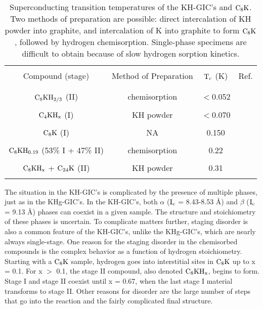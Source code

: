 \begin{table}
\begin{center}
\caption[Superconducting transition temperatures of the
KH-GIC's]{Superconducting transition temperatures of the KH-GIC's  and $\rm
C_8K$.  Two methods of preparation are possible: direct intercalation of KH
powder into graphite,\cite{enoki88a}  and intercalation of K  into graphite
to   form  $\rm C_8K$,  followed  by hydrogen  chemisorption.\cite{enoki85}
Single-phase specimens are difficult  to  obtain  because of  slow hydrogen
sorption kinetics.\cite{suzuki85b,enoki85}}
\vspace{0.5in}
\label{khtctable}
\begin{tabular}{|cccc|}
\hline
& & & \\
Compound (stage) & Method of Preparation & $\rm T_c$ (K) & Ref. \\
& & & \\
\hline
& & & \\
$\rm C_8KH_{2/3}$ (II)& chemisorption & $<$0.052 & \cite{sano80}\\
& & & \\
$\rm C_4KH_x$ (I)& KH powder & $<$0.070 & \cite{suzuki85b}\\
& & & \\
$\rm C_8K$ (I) & NA & 0.150 & \cite{koike80}\\
& & & \\
$\rm C_8KH_{0.19}$ (53\% I + 47\% II)& chemisorption& 0.22 & \cite{kaneiwa82}\\
& & & \\
$\rm C_8KH_x$ + $\rm C_{24}K$ (II)& KH powder & 0.31 & \cite{suzuki85b}\\
& & & \\
\hline
\end{tabular}
\end{center}
\end{table}

        The situation  in  the KH-GIC's is complicated  by the  presence of
multiple phases, just as in the KHg-GIC's.  In  the KH-GIC's, both $\alpha$
($\rm I_c$ = 8.43-8.53 \AA) and $\beta$ ($\rm I_c$ = 9.13  \AA)  phases can
coexist   in  a  given  sample.\cite{I217,suzuki85b}   The structure    and
stoichiometry of these phases is uncertain.\cite{miyajima88}  To complicate
matters further, staging disorder is also a common feature of the KH-GIC's,
unlike the KHg-GIC's, which are nearly always single-stage.  One reason for
the staging disorder in  the chemisorbed compounds  is the complex behavior
as  a  function of   hydrogen stoichiometry.   Starting  with  a $\rm C_8K$
sample, hydrogen goes into interstitial sites in $\rm C_8K$ up  to x = 0.1.
For x $>$ 0.1, the stage II compound, also denoted $\rm C_8KH_x$, begins to
form.  Stage I and stage II coexist until  x = 0.67, when  the last stage I
material  transforms  to  stage  II.\cite{lagrange74}  Other   reasons  for
disorder are the large number of  steps that  go into  the reaction and the
fairly complicated final structure.

